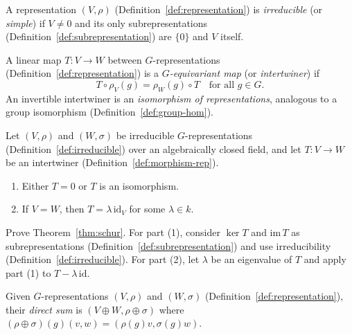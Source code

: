 \begin{definition}
\label{def:irreducible}
A representation $(V, \rho)$ (Definition~\ref{def:representation}) is \emph{irreducible} (or \emph{simple}) if $V \neq 0$ and its only subrepresentations (Definition~\ref{def:subrepresentation}) are $\{0\}$ and $V$ itself.
\end{definition}

\begin{definition}
\label{def:morphism-rep}
A linear map $T : V \to W$ between $G$-representations (Definition~\ref{def:representation}) is a \emph{$G$-equivariant map} (or \emph{intertwiner}) if
\[
  T \circ \rho_V(g) = \rho_W(g) \circ T \quad \text{for all } g \in G.
\]
An invertible intertwiner is an \emph{isomorphism of representations}, analogous to a group isomorphism (Definition~\ref{def:group-hom}).
\end{definition}

\begin{theorem}
\label{thm:schur}
Let $(V, \rho)$ and $(W, \sigma)$ be irreducible $G$-representations (Definition~\ref{def:irreducible}) over an algebraically closed field, and let $T : V \to W$ be an intertwiner (Definition~\ref{def:morphism-rep}).
\begin{enumerate}
  \item Either $T = 0$ or $T$ is an isomorphism.
  \item If $V = W$, then $T = \lambda\, \mathrm{id}_V$ for some $\lambda \in k$.
\end{enumerate}
\end{theorem}

\begin{exercise}
Prove Theorem~\ref{thm:schur}. For part (1), consider $\ker T$ and $\mathrm{im}\, T$ as subrepresentations (Definition~\ref{def:subrepresentation}) and use irreducibility (Definition~\ref{def:irreducible}). For part (2), let $\lambda$ be an eigenvalue of $T$ and apply part (1) to $T - \lambda\,\mathrm{id}$.
\end{exercise}

\begin{definition}
\label{def:direct-sum-rep}
Given $G$-representations $(V, \rho)$ and $(W, \sigma)$ (Definition~\ref{def:representation}), their \emph{direct sum} is $(V \oplus W, \rho \oplus \sigma)$ where $(\rho \oplus \sigma)(g)(v, w) = (\rho(g)v, \sigma(g)w)$.
\end{definition}

